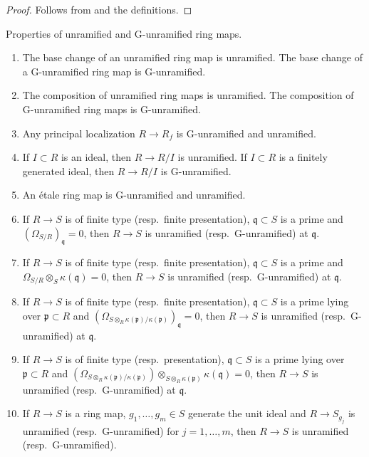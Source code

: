 \begin{proof}
Follows from 
and the definitions.
\end{proof}

\begin{lemma}
\label{lemma-unramified}
Properties of unramified and G-unramified ring maps.
\begin{enumerate}
\item The base change of an unramified ring map is unramified.
The base change of a G-unramified ring map is G-unramified.
\item The composition of unramified ring maps is unramified.
The composition of G-unramified ring maps is G-unramified.
\item Any principal localization $R \to R_f$ is G-unramified and
unramified.
\item If $I \subset R$ is an ideal, then $R \to R/I$ is unramified.
If $I \subset R$ is a finitely generated ideal, then $R \to R/I$ is
G-unramified.
\item An \'etale ring map is G-unramified and unramified.
\item If $R \to S$ is of finite type (resp.\ finite presentation),
$\mathfrak q \subset S$ is a prime and $(\Omega_{S/R})_{\mathfrak q} = 0$,
then $R \to S$ is unramified (resp.\ G-unramified) at $\mathfrak q$.
\item If $R \to S$ is of finite type (resp.\ finite presentation),
$\mathfrak q \subset S$ is a prime and
$\Omega_{S/R} \otimes_S \kappa(\mathfrak q) = 0$, then
$R \to S$ is unramified (resp.\ G-unramified) at $\mathfrak q$.
\item If $R \to S$ is of finite type (resp.\ finite presentation),
$\mathfrak q \subset S$ is a prime lying over $\mathfrak p \subset R$ and
$(\Omega_{S \otimes_R \kappa(\mathfrak p)/\kappa(\mathfrak p)})_{\mathfrak q}
= 0$, then $R \to S$ is unramified (resp.\ G-unramified) at $\mathfrak q$.
\item If $R \to S$ is of finite type (resp.\ presentation),
$\mathfrak q \subset S$ is a prime lying over $\mathfrak p \subset R$ and
$(\Omega_{S \otimes_R \kappa(\mathfrak p)/\kappa(\mathfrak p)})
\otimes_{S \otimes_R \kappa(\mathfrak p)} \kappa(\mathfrak q) = 0$,
then $R \to S$ is unramified (resp.\ G-unramified) at $\mathfrak q$.
\item If $R \to S$ is a ring map, $g_1, \ldots, g_m \in S$ generate
the unit ideal and $R \to S_{g_j}$ is unramified (resp.\ G-unramified) for
$j = 1, \ldots, m$, then $R \to S$ is unramified (resp.\ G-unramified).

\end{enumerate}
\end{lemma}
